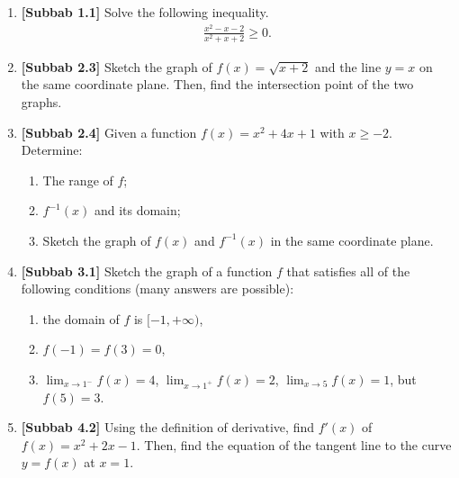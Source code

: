 \documentclass[10pt,openany,a4paper]{article}
\theoremstyle{definition}
\theoremstyle{definition}
\theoremstyle{plain}
\begin{document}
\begin{enumerate}
    \item \textbf{[Subbab 1.1]} Solve the following inequality.
    \begin{align*}
        \frac{x^2-x-2}{x^2+x+2}\geq 0.
    \end{align*}

    \item \textbf{[Subbab 2.3]} Sketch the graph of $f(x)=\sqrt{x+2}$ and the line $y=x$ on the same coordinate plane. Then, find the intersection point of the two graphs.

    \item \textbf{[Subbab 2.4]} Given a function $f(x)=x^2+4x+1$ with $x\geq -2$. Determine:
    \begin{enumerate}
        \item[a)] The range of $f$;
        \item[b)] $f^{-1}(x)$ and its domain;
        \item[c)] Sketch the graph of $f(x)$ and $f^{-1}(x)$ in the same coordinate plane.
    \end{enumerate}

    \item \textbf{[Subbab 3.1]} Sketch the graph of a function $f$ that satisfies all of the following conditions (many answers are possible):
    \begin{enumerate}
        \item[a.] the domain of $f$ is $[-1,+\infty)$,
        \item[b.] $f(-1)=f(3)=0$,
        \item[c.] $\displaystyle\lim_{x\to 1^-}f(x)=4$, $\displaystyle\lim_{x\to 1^+}f(x)=2$, $\displaystyle\lim_{x\to 5}f(x)=1$, but $f(5)=3$.
    \end{enumerate}

    \item \textbf{[Subbab 4.2]} Using the definition of derivative, find $f'(x)$ of $f(x)=x^2+2x-1$. Then, find the equation of the tangent line to the curve $y=f(x)$ at $x=1$.
\end{enumerate}

\newpage
\end{document}
